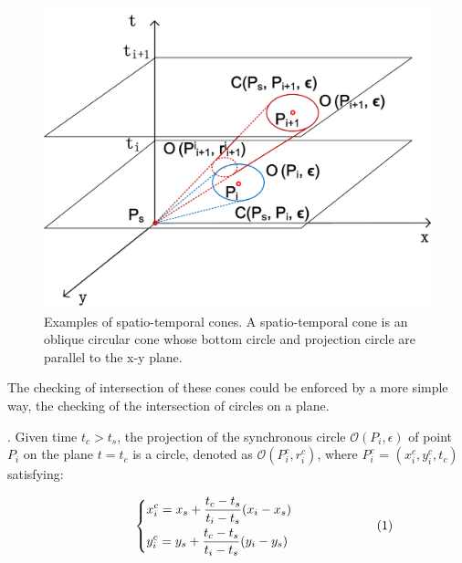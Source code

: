 \begin{figure}[tb!]
\centering
\includegraphics[scale=0.6]{figures/Fig-cis.png}
\caption{\small Examples of spatio-temporal cones. A spatio-temporal cone is an oblique circular cone whose bottom circle and projection circle are parallel to the x-y plane. }
\vspace{-2ex}
\label{fig:cis}
\end{figure}

The checking of intersection of these cones could be enforced by a more simple way, \ie the checking of the intersection of circles on a plane.

. Given time $t_c > t_s$, the projection of the synchronous circle $\mathcal{O}(P_i, \epsilon)$ of point $P_i$ on the plane $t=t_c$ is a circle, denoted as $\mathcal{O}(P^c_i, r^c_i)$, where $P^c_i$ =  $(x^c_i, y^c_i, t_c)$ satisfying:


\vspace{-1ex}
\begin{equation*}
\label{equ-proj-circle-xy}
\hspace{10ex} \left\{
    \begin{aligned}
        & x^c_i = x_s +  \frac{t_c - t_s}{t_i - t_s}(x_i - x_s) \\
        & y^c_i = y_s +  \frac{t_c - t_s}{t_i - t_s}(y_i - y_s) \\
    \end{aligned}
    \right.       \hspace{15ex}(1)
\end{equation*}
\vspace{-1ex}

